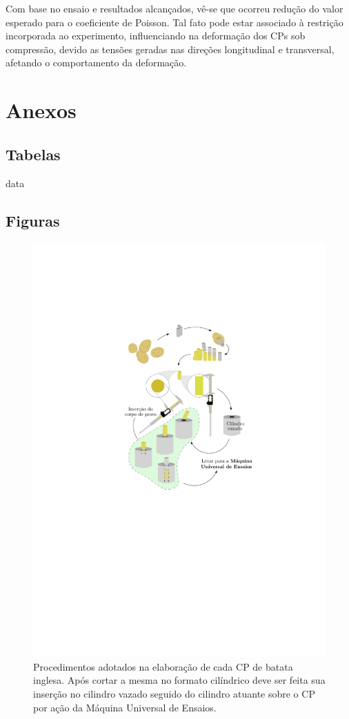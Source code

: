 \documentclass[a4paper, 12pt, brazilian]{article}
\begin{document}
	Com base no ensaio e resultados alcançados, vê-se que ocorreu redução do valor esperado para o coeficiente de Poisson. Tal fato pode estar associado à restrição incorporada ao experimento, influenciando na deformação dos CPs sob compressão, devido as tensões geradas nas direções longitudinal e transversal, afetando o comportamento da deformação.
	\section{Anexos}
	
	\subsection{Tabelas}
	
	{data}
	
	\subsection{Figuras}
	
	\begin{figure}[H]
		\centering
		\includegraphics[scale=1.1]{images/diagram}
		\caption{Procedimentos adotados na elaboração de cada CP de batata inglesa. Após cortar a mesma no formato cilíndrico deve ser feita sua inserção no cilindro vazado seguido do cilindro atuante sobre o CP por ação da Máquina Universal de Ensaios.}
		\label{fig:diagram}
	\end{figure}
\end{document}
